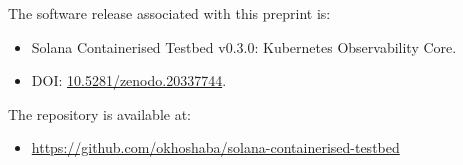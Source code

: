\documentclass[11pt,a4paper]{article}
\begin{document}
The software release associated with this preprint is:

\begin{itemize}
  \item Solana Containerised Testbed v0.3.0: Kubernetes Observability Core.
  \item DOI: \href{https://doi.org/10.5281/zenodo.20337744}{10.5281/zenodo.20337744}.
\end{itemize}

The repository is available at:

\begin{itemize}
  \item \url{https://github.com/okhoshaba/solana-containerised-testbed}
\end{itemize}



\end{document}

